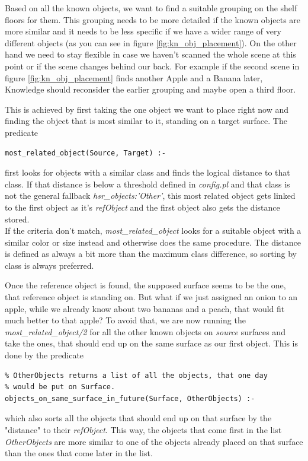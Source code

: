 \documentclass[main.tex]{subfiles}
\begin{document}
Based on all the known objects, we want to find a suitable grouping on the shelf floors for them. This grouping needs to be more detailed if the known objects are more similar and it needs to be less specific if we have a wider range of very different objects (as you can see in figure \ref{fig:kn_obj_placement}). On the other hand we need to stay flexible in case we haven't scanned the whole scene at this point or if the scene changes behind our back. For example if the second scene in figure \ref{fig:kn_obj_placement} finds another Apple and a Banana later, Knowledge should reconsider the earlier grouping and maybe open a third floor.

This is achieved by first taking the one object we want to place right now and finding the object that is most similar to it, standing on a target surface. The predicate
\begin{lstlisting}
most_related_object(Source, Target) :-
\end{lstlisting}
first looks for objects with a similar class and finds the logical distance to that class. If that distance is below a threshold defined in \textit{config.pl} and that class is not the general fallback \textit{hsr\_objects:'Other'}, this most related object gets linked to the first object as it's \textit{refObject} and the first object also gets the distance stored.\\
If the criteria don't match, \textit{most\_related\_object} looks for a suitable object with a similar color or size instead and otherwise does the same procedure. The distance is defined as always a bit more than the maximum class difference, so sorting by class is always preferred.

Once the reference object is found, the supposed surface seems to be the one, that reference object is standing on. But what if we just assigned an onion to an apple, while we already know about two bananas and a peach, that would fit much better to that apple? To avoid that, we are now running the \textit{most\_related\_object/2} for all the other known objects on \textit{source} surfaces and take the ones, that should end up on the same surface as our first object. This is done by the predicate
\begin{lstlisting}
% OtherObjects returns a list of all the objects, that one day 
% would be put on Surface.
objects_on_same_surface_in_future(Surface, OtherObjects) :-
\end{lstlisting}
which also sorts all the objects that should end up on that surface by the "distance" to their \textit{refObject}. This way, the objects that come first in the list \textit{OtherObjects} are more similar to one of the objects already placed on that surface than the ones that come later in the list.
\end{document}
